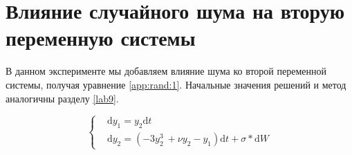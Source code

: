 \clearpage
\section{Влияние случайного шума на вторую
переменную системы}

В данном эксперименте мы добавляем влияние шума
ко второй переменной системы, получая уравнение \eqref{app:rand:1}.
Начальные значения решений и метод аналогичны разделу \ref{lab9}.

\begin{equation}\label{app:rand:1}
\begin{cases}
    &\mathrm{d}y_1 = y_2\mathrm{d}t\\
    &\mathrm{d}y_2 = (-3y_2^3\ + \nu y_2 - y_1)\mathrm{d}t + \sigma * \mathrm{d}W
\end{cases}
\end{equation}

